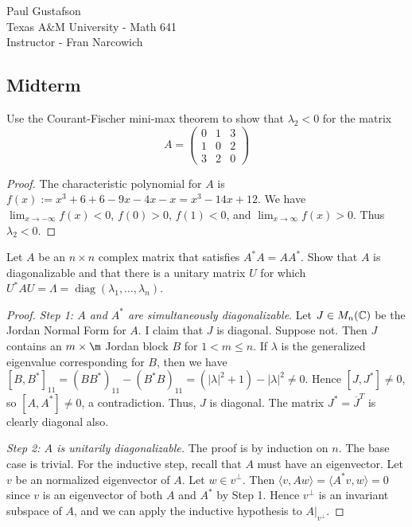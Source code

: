 \documentclass{article}
\DeclareMathOperator{\diag}{diag}
\begin{document}
\noindent Paul Gustafson\\
\noindent Texas A\&M University - Math 641\\ 
\noindent Instructor - Fran Narcowich

\subsection*{Midterm}

 Use the Courant-Fischer mini-max theorem to show that $\lambda_2 < 0$ for the matrix 
$$A = \begin{pmatrix} 
   0 & 1 & 3
\\ 1 & 0 & 2
\\ 3 & 2 & 0
\end{pmatrix}$$

\begin{proof}
The characteristic polynomial for $A$ is $f(x) := x^3 +6 + 6 - 9x -4x - x = x^3 - 14x + 12$.  We have $\lim_{x\to -\infty} f(x) < 0$, $f(0) > 0$, $f(1) < 0$, and $\lim_{x \to \infty} f(x) > 0$. Thus $\lambda_2 < 0$.
\end{proof}

 Let $A$ be an $n \times n$ complex matrix that satisfies $A^* A = A A^*$. Show that $A$ is diagonalizable and that there is a unitary matrix $U$ for which $U^*AU = \Lambda = \diag(\lambda_1, \ldots, \lambda_n)$.

\begin{proof}
\emph{Step 1: $A$ and $A^*$ are simultaneously diagonalizable}.  Let $J \in M_n(\mathbb{C})$ be the Jordan Normal Form for $A$.  I claim that $J$ is diagonal. Suppose not. Then $J$ contains an $m \times \m$ Jordan block $B$ for $ 1< m \le n$.  If $\lambda$ is the generalized eigenvalue corresponding for $B$, then we have $[B, B^*]_{11} = (B B^*)_{11} - (B^*B)_{11} = (|\lambda|^2 + 1) - |\lambda|^2 \neq 0$.  Hence $[J, J^*] \neq 0$, so $[A, A^*] \neq 0$, a contradiction. Thus, $J$ is diagonal. The matrix $J^* = \overline{J}^T$ is clearly diagonal also.

\emph{Step 2: $A$ is unitarily diagonalizable.}  The proof is by induction on $n$. The base case is trivial. For the inductive step, recall that $A$ must have an eigenvector.  Let $v$ be an normalized eigenvector of $A$.  Let $w \in v^\perp$.  Then $\langle v, Aw \rangle = \langle A^*v , w \rangle = 0$ since $v$ is an eigenvector of both $A$ and $A^*$ by Step 1.  Hence $v^\perp$ is an invariant subspace of $A$, and we can apply the inductive hypothesis to $A \vert_{v^\perp}$.  
\end{proof}
\end{document}
